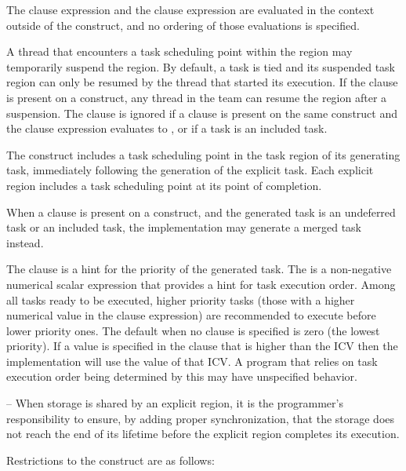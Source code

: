 The  clause expression and the  clause expression are evaluated in the context 
outside of the  construct, and no ordering of those evaluations is specified.

A thread that encounters a task scheduling point within the  region may 
temporarily suspend the  region. By default, a task is tied and its suspended task 
region can only be resumed by the thread that started its execution. If the  
clause is present on a  construct, any thread in the team can resume the  
region after a suspension. The  clause is ignored if a  clause is present 
on the same  construct and the  clause expression evaluates to , or if a 
task is an included task.

The  construct includes a task scheduling point in the task region of its generating 
task, immediately following the generation of the explicit task. Each explicit  
region includes a task scheduling point at its point of completion. 

When a  clause is present on a  construct, and the generated task is 
an undeferred task or an included task, the implementation may generate a merged task 
instead.

The  clause is a hint for the priority of the generated task. The  is a
non-negative numerical scalar expression that provides a hint for task execution order. Among all
tasks ready to be executed, higher priority tasks (those with a higher numerical value in the
 clause expression) are recommended to execute before lower priority ones. The default
 when no  clause is specified is zero (the lowest priority). If a value is
specified in the  clause that is higher than the  ICV then the
implementation will use the value of that ICV. A program that relies on task execution order
being determined by this  may have unspecified behavior.

\notestart
\noteheader – When storage is shared by an explicit  region, it is the programmer's 
responsibility to ensure, by adding proper synchronization, that the storage does not 
reach the end of its lifetime before the explicit  region completes its execution.
\noteend

\restrictions
Restrictions to the  construct are as follows:

